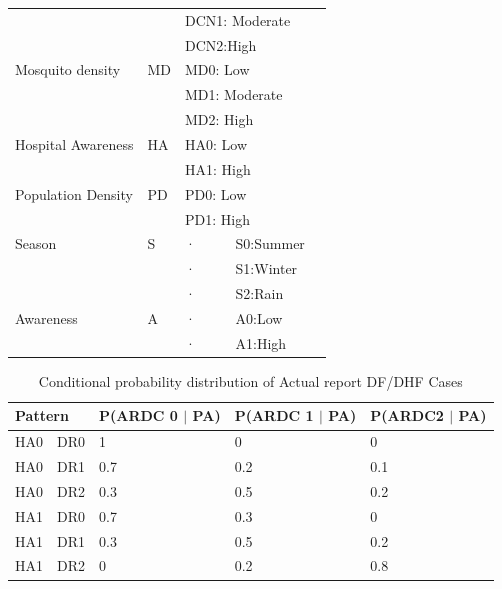 \documentclass[review]{elsarticle}
\begin{document}
\begin{table}[!htbp]
\begin{tabular}{|l|l|l|l|}
			&  & DCN1: Moderate & \\
			&  & DCN2:High & \\
			\hline
			Mosquito density & MD & MD0: Low & \\
			&  & MD1: Moderate & \\
			&  & MD2: High & \\
			\hline
			Hospital Awareness & HA & HA0: Low & \\
			&  & HA1: High & \\
			\hline
			Population Density & PD & PD0: Low & \\
			&  & PD1: High & \\
			\hline
			Season & S & ·      S0:Summer & \\
			&  & ·      S1:Winter & \\
			&  & ·      S2:Rain & \\
			\hline 
			Awareness & A & ·      A0:Low & \\			
			&  & ·      A1:High & \\
			\hline
			
		\end{tabular}
	\end{table}
	
	\begin{table}[!htbp]
		\centering
		\normalsize
		\begin{tabular}{|l|l|l|l|l|}
			\hline
			\multicolumn{2}{|l|}{Pattern}  & P(ARDC 0 $\mid$ PA) & P(ARDC 1 $\mid$ PA) & P(ARDC2 $\mid$ PA)\\
			\hline
			HA0 & DR0 & 1 & 0 & 0\\
			\hline
			HA0 & DR1 & 0.7 & 0.2 & 0.1\\
			\hline
			HA0 & DR2 & 0.3 & 0.5 & 0.2\\
			\hline
			HA1 & DR0 & 0.7 & 0.3 & 0\\
			\hline
			HA1 & DR1 & 0.3 & 0.5 & 0.2\\
			\hline
			HA1 & DR2 & 0 & 0.2 & 0.8\\
			\hline
		\end{tabular}
		\caption{Conditional probability distribution of Actual report DF/DHF Cases}
	\end{table}
	
\end{document}

